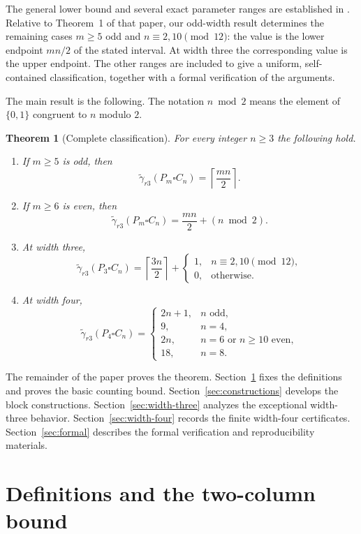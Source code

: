 \documentclass[11pt]{article}
\newtheorem{theorem}{Theorem}[section]
\theoremstyle{definition}
\theoremstyle{remark}
\newcommand{\srdom}{\widetilde\gamma_{r3}}
\begin{document}
The general lower bound and several exact parameter ranges are established in \cite{Zerovnik2026}. Relative to Theorem~1 of that paper, our odd-width result determines the remaining cases $m\geq5$ odd and $n\equiv2,10\pmod{12}$: the value is the lower endpoint $mn/2$ of the stated interval. At width three the corresponding value is the upper endpoint. The other ranges are included to give a uniform, self-contained classification, together with a formal verification of the arguments.

The main result is the following. The notation $n\bmod 2$ means the element of $\{0,1\}$ congruent to $n$ modulo $2$.

\begin{theorem}[Complete classification]\label{thm:main}
For every integer $n\geq 3$ the following hold.
\begin{enumerate}
  \item If $m\geq 5$ is odd, then
  \[
    \srdom(P_m\square C_n)=\left\lceil\frac{mn}{2}\right\rceil.
  \]
  \item If $m\geq 6$ is even, then
  \[
    \srdom(P_m\square C_n)=\frac{mn}{2}+(n\bmod 2).
  \]
  \item At width three,
  \[
  \srdom(P_3\square C_n)=\left\lceil\frac{3n}{2}\right\rceil+
  \begin{cases}
    1,& n\equiv 2,10\pmod {12},\\
    0,&\text{otherwise}.
  \end{cases}
  \]
  \item At width four,
  \[
  \srdom(P_4\square C_n)=
  \begin{cases}
    2n+1,& n\text{ odd},\\
    9,& n=4,\\
    2n,& n=6\text{ or }n\geq 10\text{ even},\\
    18,& n=8.
  \end{cases}
  \]
\end{enumerate}
\end{theorem}

The remainder of the paper proves the theorem. Section~\ref{sec:definitions} fixes the definitions and proves the basic counting bound. Section~\ref{sec:constructions} develops the block constructions. Section~\ref{sec:width-three} analyzes the exceptional width-three behavior. Section~\ref{sec:width-four} records the finite width-four certificates. Section~\ref{sec:formal} describes the formal verification and reproducibility materials.

\section{Definitions and the two-column bound}\label{sec:definitions}
\end{document}
